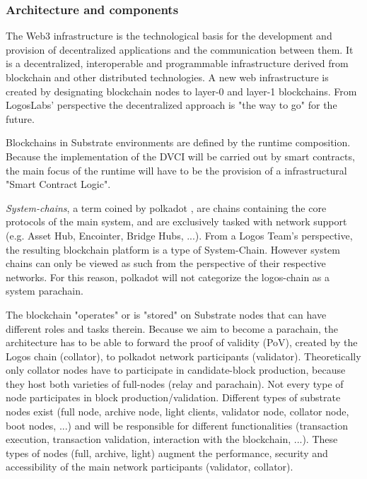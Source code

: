\documentclass[]{article}
\begin{document}
\subsubsection{Architecture and components}
The Web3 infrastructure is the technological basis for the development and provision of decentralized applications and the communication between them. 
It is a decentralized, interoperable and programmable infrastructure derived from blockchain and other distributed technologies.
A new web infrastructure is created by designating blockchain nodes to layer-0 and layer-1 blockchains.
From LogosLabs' perspective the decentralized approach is "the way to go" for the future. 

Blockchains in Substrate environments are defined by the runtime composition. 
Because the implementation of the DVCI will be carried out by smart contracts, the main focus of the runtime will have to be the provision of a infrastructural "Smart Contract Logic".

\textit{System-chains}, a term coined by polkadot \cite{PolkadotDoc-sys-parachain}, are chains containing the core protocols of the main system, and are exclusively tasked with network support (e.g. Asset Hub, Encointer, Bridge Hubs, ...). 
From a Logos Team's perspective, the resulting blockchain platform is a type of System-Chain. 
However system chains can only be viewed as such from the perspective of their respective networks. 
For this reason, polkadot will not categorize the logos-chain as a system parachain.

The blockchain "operates" or is "stored" on Substrate nodes that can have different roles and tasks therein.
Because we aim to become a parachain, the architecture has to be able to forward the proof of validity (PoV), created by the Logos chain (collator), to polkadot network participants (validator). 
Theoretically only collator nodes have to participate in candidate-block production, because they host both varieties of full-nodes (relay and parachain).
Not every type of node participates in block production/validation. 
Different types of substrate nodes exist (full node, archive node, light clients, validator node, collator node, boot nodes, ...) and will be responsible for different functionalities (transaction execution, transaction validation, interaction with the blockchain, ...).
These types of nodes (full, archive, light) augment the performance, security and accessibility of the main network participants (validator, collator).
\end{document}
